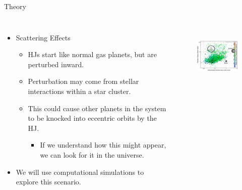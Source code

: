 \documentclass{beamer}
\begin{document}
\begin{frame}{Theory}
    \begin{columns}
        \begin{itemize}
            \item Scattering Effects
                \begin{itemize}
                    \item HJs start like normal gas planets, but are perturbed inward.
                    \item Perturbation may come from stellar interactions
                        within a star cluster.
                    \item This could cause other planets in the system to be
                        knocked into eccentric orbits by the HJ.
                        \begin{itemize}
                            \item If we understand how this might appear,
                                we can look for it in the universe.
                        \end{itemize}
                \end{itemize}
            \item We will use computational simulations to explore this scenario.
        \end{itemize}
            \begin{figure}
                \centering
                \includegraphics[height=1.25in]{hot_jupiter_measure_plot}
            \end{figure}
    \end{columns}
\end{frame}
\end{document}
